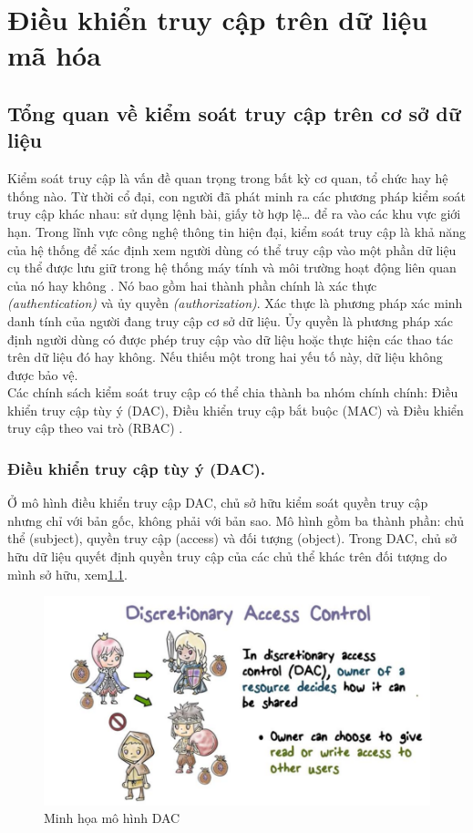 \chapter{Điều khiển truy cập trên dữ liệu mã hóa}

\section{Tổng quan về kiểm soát truy cập trên cơ sở dữ liệu}

Kiểm soát truy cập là vấn đề quan trọng trong bất kỳ cơ quan, tổ chức hay hệ
thống nào. Từ thời cổ đại, con người đã phát minh ra các phương pháp kiểm soát truy
cập khác nhau: sử dụng lệnh bài, giấy tờ hợp lệ… để ra vào các khu vực giới hạn. Trong
lĩnh vực công nghệ thông tin hiện đại, kiểm soát truy cập là khả năng của hệ thống để
xác định xem người dùng có thể truy cập vào một phần dữ liệu cụ thể được lưu giữ trong
hệ thống máy tính và môi trường hoạt động liên quan của nó hay không \cite{emms1987definition}. Nó bao gồm
hai thành phần chính là xác thực \textit{(authentication)} và ủy quyền \textit{(authorization)}. Xác thực
là phương pháp xác minh danh tính của người đang truy cập cơ sở dữ liệu. Ủy quyền là
phương pháp xác định người dùng có được phép truy cập vào dữ liệu hoặc thực hiện các
thao tác trên dữ liệu đó hay không. Nếu thiếu một trong hai yếu tố này, dữ liệu không
được bảo vệ. \\

Các chính sách kiểm soát truy cập có thể chia thành ba nhóm chính chính: Điều
khiển truy cập tùy ý (DAC), Điều khiển truy cập bắt buộc (MAC) và Điều khiển truy cập
theo vai trò (RBAC) \cite{sandhu1996role}.
\subsection{Điều khiển truy cập tùy ý (DAC).}
Ở mô hình điều khiển truy cập DAC, chủ sở hữu kiểm soát quyền truy cập nhưng
chỉ với bản gốc, không phải với bản sao. Mô hình gồm ba thành phần: chủ thể (subject),
quyền truy cập (access) và đối tượng (object). Trong DAC, chủ sở hữu dữ liệu quyết
định quyền truy cập của các chủ thể khác trên đối tượng do mình sở hữu, xem\ref{fig:chap2-dac}. 
\begin{figure}
    \centering
    \includegraphics[scale=0.5]{graphics/chapter-2/chap2-dac.png}
    \caption{Minh họa mô hình DAC}
    \label{fig:chap2-dac}
\end{figure}

